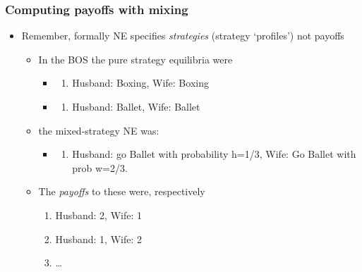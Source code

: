 \documentclass[]{article}
\providecommand{\tightlist}{%
  \setlength{\itemsep}{0pt}\setlength{\parskip}{0pt}}
\begin{document}
\hypertarget{computing-payoffs-with-mixing}{%
\subsubsection{Computing payoffs with mixing}\label{computing-payoffs-with-mixing}}

\begin{itemize}
\tightlist
\item
  Remember, formally NE specifies \emph{strategies} (strategy `profiles') not payoffs

  \begin{itemize}
  \tightlist
  \item
    In the BOS the pure strategy equilibria were

    \begin{itemize}
    \item
      \begin{enumerate}
      \def\labelenumi{\roman{enumi}.}
      \tightlist
      \item
        Husband: Boxing, Wife: Boxing
      \end{enumerate}
    \item
      \begin{enumerate}
      \def\labelenumi{\roman{enumi}.}
      \setcounter{enumi}{1}
      \tightlist
      \item
        Husband: Ballet, Wife: Ballet
      \end{enumerate}
    \end{itemize}
  \item
    the mixed-strategy NE was:

    \begin{itemize}
    \item
      \begin{enumerate}
      \def\labelenumi{\roman{enumi}.}
      \setcounter{enumi}{2}
      \tightlist
      \item
        Husband: go Ballet with probability h=1/3, Wife: Go Ballet with prob w=2/3.
      \end{enumerate}
    \end{itemize}
  \item
    The \emph{payoffs} to these were, respectively

    \begin{enumerate}
    \def\labelenumi{\roman{enumi}.}
    \tightlist
    \item
      Husband: 2, Wife: 1
    \item
      Husband: 1, Wife: 2
    \item
      \ldots{}
    \end{enumerate}
  \end{itemize}
\end{itemize}
\end{document}
